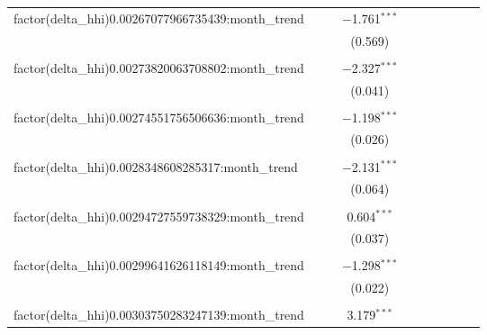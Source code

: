 \begin{table}[H]
{\begin{tabular}{@{\extracolsep{5pt}}lccccccccc}
  factor(delta\_hhi)0.00267077966735439:month\_trend &  &  & $-$1.761$^{***}$ &  &  &  &  &  &  \\  

   &  &  & (0.569) &  &  &  &  &  &  \\  

   & & & & & & & & & \\  

  factor(delta\_hhi)0.00273820063708802:month\_trend &  &  & $-$2.327$^{***}$ &  &  &  &  &  &  \\  

   &  &  & (0.041) &  &  &  &  &  &  \\  

   & & & & & & & & & \\  

  factor(delta\_hhi)0.00274551756506636:month\_trend &  &  & $-$1.198$^{***}$ &  &  &  &  &  &  \\  

   &  &  & (0.026) &  &  &  &  &  &  \\  

   & & & & & & & & & \\  

  factor(delta\_hhi)0.0028348608285317:month\_trend &  &  & $-$2.131$^{***}$ &  &  &  &  &  &  \\  

   &  &  & (0.064) &  &  &  &  &  &  \\  

   & & & & & & & & & \\  

  factor(delta\_hhi)0.00294727559738329:month\_trend &  &  & 0.604$^{***}$ &  &  &  &  &  &  \\  

   &  &  & (0.037) &  &  &  &  &  &  \\  

   & & & & & & & & & \\  

  factor(delta\_hhi)0.00299641626118149:month\_trend &  &  & $-$1.298$^{***}$ &  &  &  &  &  &  \\  

   &  &  & (0.022) &  &  &  &  &  &  \\  

   & & & & & & & & & \\  

  factor(delta\_hhi)0.00303750283247139:month\_trend &  &  & 3.179$^{***}$ &  &  &  &  &  &  \\  


\end{tabular}}
\end{table}
